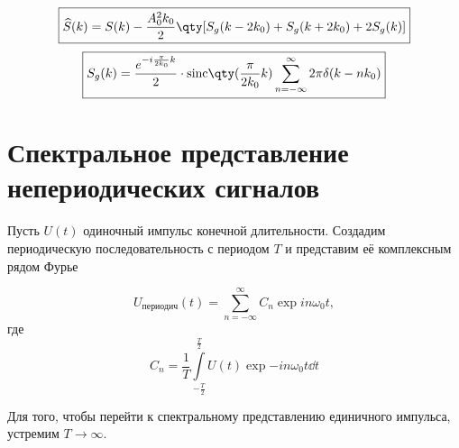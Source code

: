 \documentclass[a4paper,14pt]{extarticle}
\begin{document}
\begin{equation}
    \boxed{
    \widehat S(k) = S(k)  
    -\frac{A_{0}^2 k_{0}}{2} \qty[
    S_g(k-2k_{0}) +
    S_g(k+2k_{0}) +
    2S_g(k)
    ] }
\end{equation}
\begin{equation}
\boxed{
    S_g(k) =\frac{e^{-i  \frac{\pi}{2 k_0}  k} }{2}\cdot
    \sinc{\frac{\pi}{2k_{0}}k}\sum\limits_{n=-\infty}^{\infty}  
    2 \pi\delta(k - n k_0)
}
\end{equation}

\appendix

\newpage
\section{Спектральное представление непериодических сигналов}%
Пусть $U(t)$ одиночный импульс конечной длительности. Создадим периодическую
последовательность с периодом $T$ и представим её комплексным рядом Фурье

\begin{equation}
    \label{eq:1}
    U_{\text{периодич} } (t) = \sum\limits_{n=-\infty}^{\infty} C_n \exp{ i n \omega_0 t},
\end{equation}
где 
\begin{equation}
    \label{eq:2}
    C_n =\frac{1}{T} \int\limits_{- \frac{T}{2}}^{\frac{T}{2}} U(t) \exp{-in\omega_{0}t } \dd t
\end{equation}

Для того, чтобы перейти к спектральному представлению единичного импульса,
устремим $T \to  \infty$.
\end{document}
